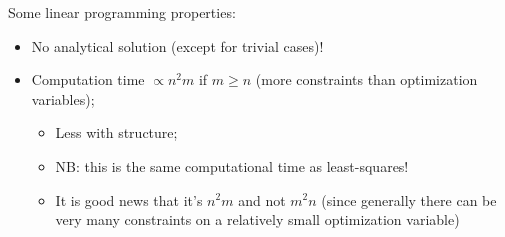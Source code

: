 \begin{Fact}
  Some linear programming properties:
  
  \begin{itemize}
  \item No analytical solution (except for trivial cases)!
  \item Computation time $\propto n^2m$ if $m\ge n$ (more constraints than optimization variables);
    \begin{itemize}
    \item Less with structure;
    \item NB: this is the same computational time as least-squares!
    \item It is good news that it's $n^2m$ and not $m^2n$ (since generally there can be very many constraints on a relatively small optimization variable)
    \end{itemize}
  \end{itemize}
\end{Fact}







